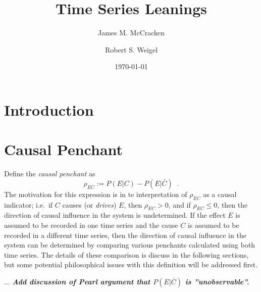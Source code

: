\documentclass[a4paper,11pt,twocolumn]{article}
\begin{document}
\title{Time Series Leanings}
\author{James M. McCracken}
\author{Robert S. Weigel}
\date{\today}


\maketitle

\section{Introduction}

\section{Causal Penchant}
Define the {\em causal penchant} as
\begin{equation}
\label{eq:pen}
\rho_{EC} := P\left(E|C\right) - P\left(E|\bar{C}\right)\;\;.
\end{equation}
The motivation for this expression is in te interpretation of $\rho_{EC}$ as a causal indicator; i.e.\ if $C$ causes (or {\em drives}) $E$, then $\rho_{EC} > 0$, and if $\rho_{EC} \le 0$, then the direction of causal influence in the system is undetermined.  If the effect $E$ is assumed to be recorded in one time series and the cause $C$ is assumed to be recorded in a different time series, then the direction of causal influence in the system can be determined by comparing various penchants calculated using both time series.  The details of these comparison is discuss in the following sections, but some potential philosophical issues with this definition will be addressed first.

$\ldots$ {\em {\bf Add discussion of Pearl argument that $P(E|\bar{C})$ is ''unobservable''.}}
\end{document}
